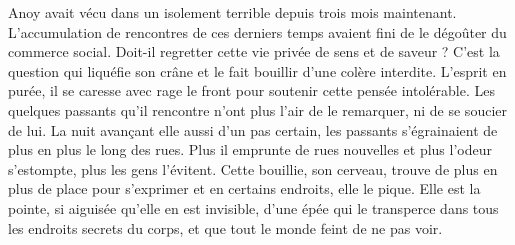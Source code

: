Anoy avait vécu dans un isolement terrible depuis trois mois
maintenant. L'accumulation de rencontres de ces derniers temps avaient
fini de le dégoûter du commerce social. Doit-il regretter cette vie
privée de sens et de saveur ?  C'est la question qui liquéfie son
crâne et le fait bouillir d'une colère interdite. L'esprit en purée,
il se caresse avec rage le front pour soutenir cette pensée
intolérable. Les quelques passants qu'il rencontre n'ont plus l'air de
le remarquer, ni de se soucier de lui. La nuit avançant elle aussi
d'un pas certain, les passants s'égrainaient de plus en plus le long
des rues. Plus il emprunte de rues nouvelles et plus l'odeur
s'estompte, plus les gens l'évitent. Cette bouillie, son cerveau,
trouve de plus en plus de place pour s'exprimer et en certains
endroits, elle le pique.  Elle est la pointe, si aiguisée qu'elle en
est invisible, d'une épée qui le transperce dans tous les endroits
secrets du corps, et que tout le monde feint de ne pas voir.






